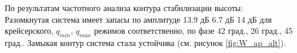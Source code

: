 По результатам частотного анализа контура стабилизации высоты:\\
Разомкнутая система имеет запасы по амплитуде 13.9 дБ 6.7 дБ 14 дБ для
крейсерского, $q_{min}$, $q_{max}$ режимов соответственно, по фазе 42 град., 26
град., 45 град.. Замыкая контур система стала устойчива
(см. рисунок \ref{fig:W_ap_alt}).   


